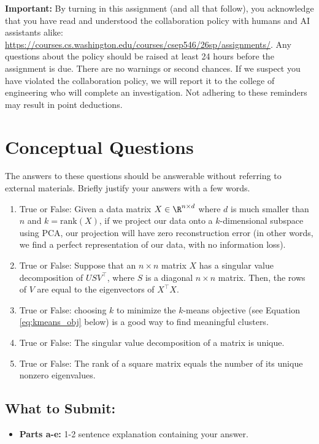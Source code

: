 \documentclass{article}
\begin{document}
\textbf{Important:} By turning in this assignment (and all that follow), you acknowledge that you have read and understood the collaboration policy with humans and AI assistants alike: \url{https://courses.cs.washington.edu/courses/csep546/26sp/assignments/}. Any questions about the policy should be raised at least 24 hours before the assignment is due. There are no warnings or second chances. If we suspect you have violated the collaboration policy, we will report it to the college of engineering who will complete an investigation.
Not adhering to these reminders may result in point deductions. \\

\clearpage{}

\section*{Conceptual Questions}
\begin{aprob}  The answers to these questions should be answerable without referring to external materials. Briefly justify your answers with a few words.
    \begin{enumerate}
        \item {} True or False: Given a data matrix $X \in \R^{n \times d}$ where $d$ is much smaller than $n$ and $k = \textrm{rank}(X)$, if we project our data onto a $k$-dimensional subspace using PCA, our projection will have zero reconstruction error (in other words, we find a perfect representation of our data, with no information loss).
        \item {} True or False: Suppose that an $n \times n$ matrix $X$ has a singular value decomposition of $USV^{\top}$, where $S$ is a diagonal $n \times n$ matrix. Then, the rows of $V$ are equal to the eigenvectors of $X^{\top}X$.
        \item {} True or False: choosing $k$ to minimize the $k$-means objective (see Equation \eqref{eq:kmeans_obj} below) is a good way to find meaningful clusters.
        \item {} True or False: The singular value decomposition of a matrix is unique. 
        \item {} True or False: The rank of a square matrix equals the number of its unique nonzero eigenvalues. 
    \end{enumerate}

    \subsection*{What to Submit:}
    \begin{itemize}
        \item \textbf{Parts a-e:} 1-2 sentence explanation containing your answer.
    \end{itemize}

\end{aprob}
\pagebreak
\end{document}
